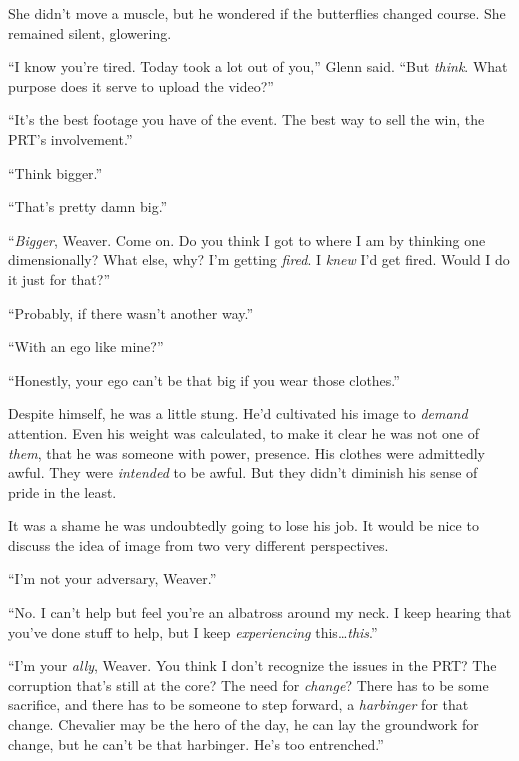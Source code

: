 She didn't move a muscle, but he wondered if the butterflies changed course.  She remained silent, glowering.



``I know you're tired.  Today took a lot out of you,'' Glenn said.  ``But \emph{think}.  What purpose does it serve to upload the video?''



``It's the best footage you have of the event.  The best way to sell the win, the PRT's involvement.''



``Think bigger.''



``That's pretty damn big.''



``\emph{Bigger}, Weaver.  Come on.  Do you think I got to where I am by thinking one dimensionally?  What else, why?  I'm getting \emph{fired}.  I \emph{knew} I'd get fired.  Would I do it just for that?''



``Probably, if there wasn't another way.''



``With an ego like mine?''



``Honestly, your ego can't be that big if you wear those clothes.''



Despite himself, he was a little stung.  He'd cultivated his image to \emph{demand} attention.  Even his weight was calculated, to make it clear he was not one of \emph{them}, that he was someone with power, presence.  His clothes were admittedly awful.  They were \emph{intended} to be awful.  But they didn't diminish his sense of pride in the least.



It was a shame he was undoubtedly going to lose his job.  It would be nice to discuss the idea of image from two very different perspectives.



``I'm not your adversary, Weaver.''



``No.  I can't help but feel you're an albatross around my neck.  I keep hearing that you've done stuff to help, but I keep \emph{experiencing} this\ldots \emph{this}.''



``I'm your \emph{ally}, Weaver.  You think I don't recognize the issues in the PRT?  The corruption that's still at the core?  The need for \emph{change}?  There has to be some sacrifice, and there has to be someone to step forward, a \emph{harbinger} for that change.  Chevalier may be the hero of the day, he can lay the groundwork for change, but he can't be that harbinger.  He's too entrenched.''



